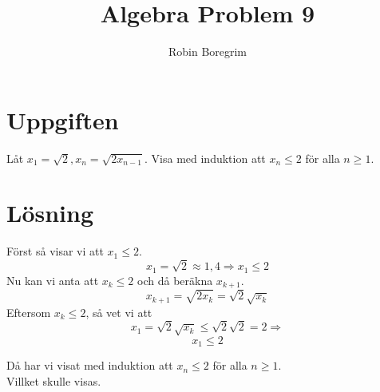 \documentclass[11pt]{article}
\begin{document}
\title{Algebra Problem 9}
\author{Robin Boregrim}
\maketitle
\renewcommand{\contentsname}{Innehållsförteckning}
\tableofcontents
\newpage
\section{Uppgiften}
Låt $x_1 = \sqrt{2}, x_n = \sqrt{2 x_{n-1}}$. Visa med induktion att $x_n \leq 2$ för alla $n\geq 1$.
\section{Lösning}
Först så visar vi att $x_1 \leq 2.$
$$x_1 = \sqrt{2} \approx 1,4 \Rightarrow x_1 \leq 2$$
Nu kan vi anta att $x_k \leq 2$ och då beräkna $x_{k+1}$.
$$x_{k+1} = \sqrt{2x_k} = \sqrt{2} \sqrt{x_k}$$
Eftersom $x_k \leq 2$, så vet vi att
$$x_1 = \sqrt{2} \sqrt{x_k} \leq \sqrt{2} \sqrt{2} = 2 \Rightarrow$$
$$x_1 \leq 2$$

Då har vi visat med induktion att $x_n \leq 2$ för alla $n \geq 1$.\\
Villket skulle visas.
\end{document}
